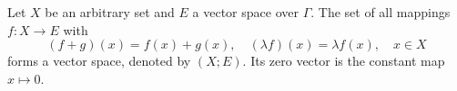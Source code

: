 Let $X$ be an arbitrary set and $E$ a vector space over $\Gamma$. The set of all mappings $f: X \to E$ with
$$(f+g)(x) = f(x) + g(x), \quad (\lambda f)(x) = \lambda f(x), \quad x \in X$$
forms a vector space, denoted by $(X; E)$. Its zero vector is the constant map $x \mapsto 0$.
